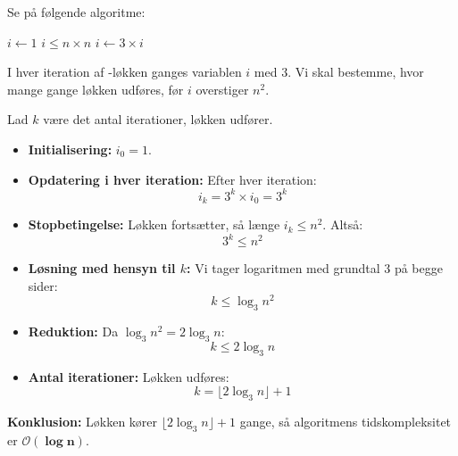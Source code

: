 \begin{example}

    Se på følgende algoritme:
    
    \begin{codebox}
        \li $i \gets 1$
        \li \While $i \leq n \times n$ \Do
        \li     $i \gets 3 \times i$
            \End
    \end{codebox}
    
    I hver iteration af \texttt{\While}-løkken ganges variablen $i$ med $3$. Vi skal bestemme, hvor mange gange løkken udføres, før $i$ overstiger $n^2$.
    
    Lad $k$ være det antal iterationer, løkken udfører.
    
    \begin{itemize}
        \item \textbf{Initialisering:} $i_0 = 1$.
        \item \textbf{Opdatering i hver iteration:} Efter hver iteration:
        \[ i_k = 3^k \times i_0 = 3^k \]
        \item \textbf{Stopbetingelse:} Løkken fortsætter, så længe $i_k \leq n^2$. Altså:
        \[ 3^k \leq n^2 \]
        \item \textbf{Løsning med hensyn til $k$:} Vi tager logaritmen med grundtal $3$ på begge sider:
        \[ k \leq \log_3 n^2 \]
        \item \textbf{Reduktion:} Da $\log_3 n^2 = 2 \log_3 n$:
        \[ k \leq 2 \log_3 n \]
        \item \textbf{Antal iterationer:} Løkken udføres:
        \[ k = \lfloor 2 \log_3 n \rfloor + 1 \]
    \end{itemize}
    
    \textbf{Konklusion:} Løkken kører $\lfloor 2 \log_3 n \rfloor + 1$ gange, så algoritmens tidskompleksitet er $\boldsymbol{\mathcal{O}(\log n)}$.
    
\end{example}

